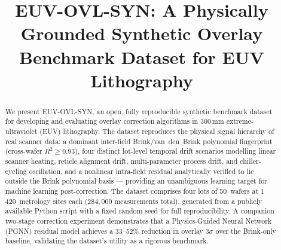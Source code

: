 \documentclass[10pt,conference]{IEEEtran}
\begin{document}
\title{EUV-OVL-SYN: A Physically Grounded Synthetic Overlay Benchmark Dataset
       for EUV Lithography}

\author{
}

\maketitle

\begin{abstract}
We present \textsc{EUV-OVL-SYN}, an open, fully reproducible synthetic
benchmark dataset for developing and evaluating overlay correction algorithms
in 300\,mm extreme-ultraviolet (EUV) lithography.
The dataset reproduces the physical signal hierarchy of real scanner data:
a dominant inter-field Brink/van~den~Brink polynomial fingerprint
(cross-wafer $R^2 \ge 0.93$), four distinct lot-level temporal drift
scenarios modelling linear scanner heating, reticle alignment drift,
multi-parameter process drift, and chiller-cycling oscillation, and a
nonlinear intra-field residual analytically verified to lie outside the
Brink polynomial basis — providing an unambiguous learning target for
machine learning post-correction.
The dataset comprises four lots of 50~wafers at 1\,420~metrology sites each
($284{,}000$ measurements total), generated from a publicly available Python
script with a fixed random seed for full reproducibility.
A companion two-stage correction experiment demonstrates that a
Physics-Guided Neural Network (PGNN) residual model achieves a 33–52\%
reduction in overlay $3\sigma$ over the Brink-only baseline, validating
the dataset's utility as a rigorous benchmark.
\end{abstract}
\end{document}
